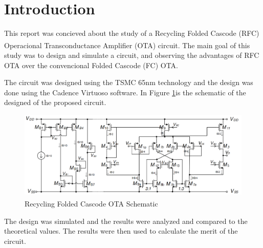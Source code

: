 \section{Introduction}

This report was concieved about the study of a Recycling Folded Cascode (RFC) Operacional Transconductance Amplifier (OTA) circuit\textsuperscript{\cite{artigo-prof}}. The main goal of this study was to design and simulate a circuit, and observing the advantages of RFC OTA over the convencional Folded Cascode (FC) OTA. 

The circuit was designed using the TSMC 65nm technology and the design was done using the Cadence Virtuoso software. In Figure \ref{fig:OTA_schematic}is the schematic of the designed of the proposed circuit.

\begin{figure}[H]
    \centering
    \includegraphics[width=1\textwidth]{Images/RFC_OTA_schematic.png}
    \caption{Recycling Folded Cascode OTA Schematic\textsuperscript{\cite{Lab-statement}}}
    \label{fig:OTA_schematic}
\end{figure}

The design was simulated and the results were analyzed and compared to the theoretical values. The results were then used to calculate the merit of the circuit.

\pagebreak

